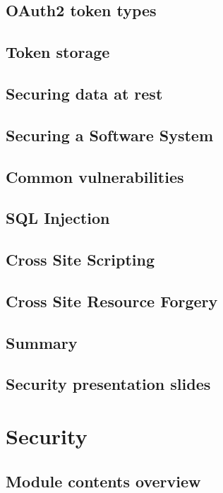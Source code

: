 \documentclass[11pt]{article}
\begin{document}
\section{OAuth2 token types}

\section{Token storage}

\section{Securing data at rest}

\section{Securing a Software System}

\section{Common vulnerabilities}

\section{SQL Injection}

\section{Cross Site Scripting}

\section{Cross Site Resource Forgery}

\section{Summary}

\section{Security presentation slides}

\chapter{Security}

\section{Module contents overview}
\end{document}

